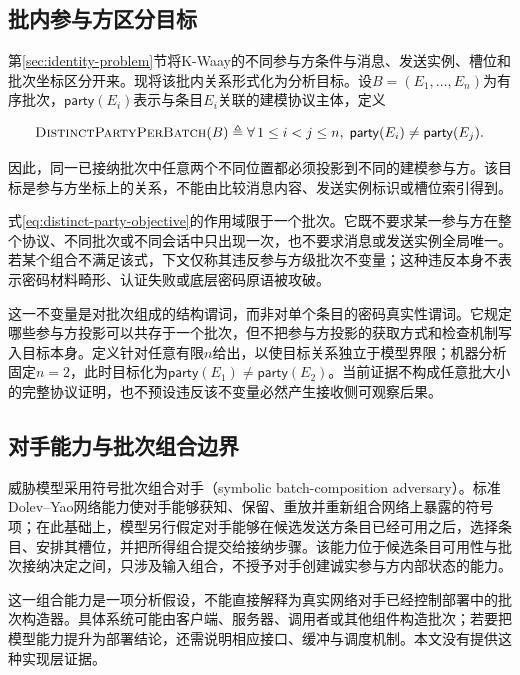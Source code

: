 \subsection{批内参与方区分目标}

第\ref{sec:identity-problem}节将K-Waay的不同参与方条件与消息、发送实例、槽位和批次坐标区分开来。现将该批内关系形式化为分析目标。设$B=(E_1,\ldots,E_n)$为有序批次，$\mathsf{party}(E_i)$表示与条目$E_i$关联的建模协议主体，定义

\begin{equation}
  \textsc{DistinctPartyPerBatch}(B)
  \mathrel{\triangleq}
  \forall\,1 \leq i < j \leq n,\;
  \mathsf{party}(E_i)\neq\mathsf{party}(E_j).
  \label{eq:distinct-party-objective}
\end{equation}

因此，同一已接纳批次中任意两个不同位置都必须投影到不同的建模参与方。该目标是参与方坐标上的关系，不能由比较消息内容、发送实例标识或槽位索引得到。

式\eqref{eq:distinct-party-objective}的作用域限于一个批次。它既不要求某一参与方在整个协议、不同批次或不同会话中只出现一次，也不要求消息或发送实例全局唯一。若某个组合不满足该式，下文仅称其违反参与方级批次不变量；这种违反本身不表示密码材料畸形、认证失败或底层密码原语被攻破。

这一不变量是对批次组成的结构谓词，而非对单个条目的密码真实性谓词。它规定哪些参与方投影可以共存于一个批次，但不把参与方投影的获取方式和检查机制写入目标本身。定义针对任意有限$n$给出，以使目标关系独立于模型界限；机器分析固定$n=2$，此时目标化为$\mathsf{party}(E_1)\neq\mathsf{party}(E_2)$。当前证据不构成任意批大小的完整协议证明，也不预设违反该不变量必然产生接收侧可观察后果。

\subsection{对手能力与批次组合边界}

威胁模型采用符号批次组合对手（symbolic batch-composition adversary）。标准Dolev--Yao网络能力使对手能够获知、保留、重放并重新组合网络上暴露的符号项；在此基础上，模型另行假定对手能够在候选发送方条目已经可用之后，选择条目、安排其槽位，并把所得组合提交给接纳步骤。该能力位于候选条目可用性与批次接纳决定之间，只涉及输入组合，不授予对手创建诚实参与方内部状态的能力。

这一组合能力是一项分析假设，不能直接解释为真实网络对手已经控制部署中的批次构造器。具体系统可能由客户端、服务器、调用者或其他组件构造批次；若要把模型能力提升为部署结论，还需说明相应接口、缓冲与调度机制。本文没有提供这种实现层证据。

